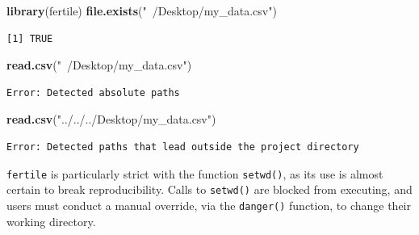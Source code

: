 \documentclass[12pt,twoside]{reedthesis}
\newenvironment{Shaded}{\begin{snugshade}}{\end{snugshade}}
\newcommand{\KeywordTok}[1]{\textcolor[rgb]{0.13,0.29,0.53}{\textbf{#1}}}
\newcommand{\StringTok}[1]{\textcolor[rgb]{0.31,0.60,0.02}{#1}}
\newcommand{\NormalTok}[1]{#1}
\begin{document}
\footnotesize
\begin{Shaded}
\begin{Highlighting}[]
\KeywordTok{library}\NormalTok{(fertile)}
\KeywordTok{file.exists}\NormalTok{(}\StringTok{"~/Desktop/my_data.csv"}\NormalTok{)}
\end{Highlighting}
\end{Shaded}
\begin{verbatim}
[1] TRUE
\end{verbatim}
\begin{Shaded}
\begin{Highlighting}[]
\KeywordTok{read.csv}\NormalTok{(}\StringTok{"~/Desktop/my_data.csv"}\NormalTok{)}
\end{Highlighting}
\end{Shaded}
\begin{verbatim}
Error: Detected absolute paths
\end{verbatim}
\begin{Shaded}
\begin{Highlighting}[]
\KeywordTok{read.csv}\NormalTok{(}\StringTok{"../../../Desktop/my_data.csv"}\NormalTok{)}
\end{Highlighting}
\end{Shaded}
\begin{verbatim}
Error: Detected paths that lead outside the project directory
\end{verbatim}
\normalsize

\texttt{fertile} is particularly strict with the function
\texttt{setwd()}, as its use is almost certain to break reproducibility.
Calls to \texttt{setwd()} are blocked from executing, and users must
conduct a manual override, via the \texttt{danger()} function, to change
their working directory.
\end{document}
